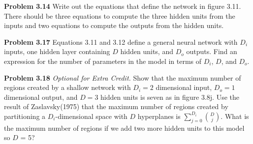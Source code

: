 \documentclass[11pt, oneside]{article}   	%
\begin{document}
\textbf{Problem 3.14} Write out the equations that define the network in
figure 3.11. There should be three equations to compute the three hidden
units from the inputs and two equations to compute the outputs from the
hidden units.

\vspace{1cm}

\textbf{Problem 3.17} Equations 3.11 and 3.12 define a general neural network
with \(D_i\) inputs, one hidden layer containing \(D\) hidden units, and
\(D_o\) outputs. Find an expression for the number of parameters in the
model in terms of \(D_i\), \(D\), and \(D_o\).

\vspace{1cm}

\textbf{Problem 3.18} \textit{Optional for Extra Credit.} 
Show that the maximum number of regions created by a shallow network 
with \(D_i = 2\) dimensional input, \(D_o = 1\) dimensional output, 
and \(D = 3\) hidden units is seven as in figure 3.8j. Use the result of 
Zaslavsky(1975) that the maximum number of regions created by 
partitioning a \(D_i\)-dimensional space with \(D\) hyperplanes 
is \(\sum_{j=0}^{D_i} \binom{D}{j} \). 
What is the maximum number of regions if we add two more hidden 
units to this model so \(D\) = 5?
\end{document}
